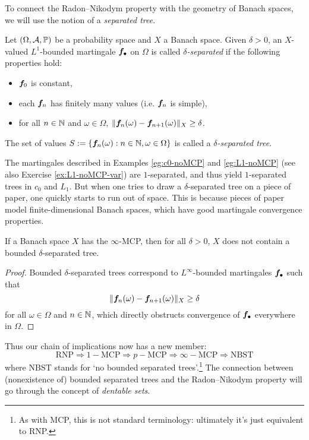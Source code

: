 To connect the Radon--Nikodym property with the geometry of Banach spaces, we will use the notion of a \emph{separated tree}.

\begin{defn}
  Let $(\Omega,\mathcal{A},\mathbb{P})$ be a probability space and $X$ a Banach space.
  Given $\delta > 0$, an $X$-valued $L^1$-bounded martingale $\bm{f}_\bullet$ on $\Omega$ is called \emph{$\delta$-separated} if the following properties hold:
  \begin{itemize}
  \item $\bm{f}_0$ is constant,
  \item each $\bm{f}_n$ has finitely many values (i.e. $\bm{f}_{n}$ is simple),
  \item for all $n \in \mathbb{N}$ and $\omega \in \Omega$, $\|\bm{f}_n(\omega) - \bm{f}_{n+1}(\omega)\|_X \geq \delta$.
  \end{itemize}
  The set of values $S := \{\bm{f}_n(\omega) : n \in \mathbb{N}, \omega \in \Omega\}$ is called a \emph{$\delta$-separated tree}.  
\end{defn}

The martingales described in Examples \ref{eg:c0-noMCP} and \ref{eg:L1-noMCP} (see also Exercise \ref{ex:L1-noMCP-var}) are $1$-separated, and thus yield $1$-separated trees in $c_0$ and $L_1$.
But when one tries to draw a $\delta$-separated tree on a piece of paper, one quickly starts to run out of space.
This is because pieces of paper model finite-dimensional Banach spaces, which have good martingale convergence properties.

\begin{prop}
  If a Banach space $X$ has the $\infty$-MCP, then for all $\delta > 0$, $X$ does not contain a bounded $\delta$-separated tree.
\end{prop}

\begin{proof}
  Bounded $\delta$-separated trees correspond to $L^\infty$-bounded martingales $\bm{f}_{\bullet}$ such that
  \begin{equation*}
    \|\bm{f}_n(\omega) - \bm{f}_{n+1}(\omega)\|_{X} \geq \delta
  \end{equation*}
  for all $\omega \in \Omega$ and $n \in \mathbb{N}$,
  which directly obstructs convergence of $\bm{f}_\bullet$ everywhere in $\Omega$.
\end{proof}

Thus our chain of implications now has a new member:
\begin{equation*}
  \mathrm{RNP} \Longrightarrow 1-\mathrm{MCP} \Longrightarrow p-\mathrm{MCP} \Longrightarrow \infty-\mathrm{MCP}
  \Longrightarrow \mathrm{NBST}
\end{equation*}
where NBST stands for `no bounded separated trees'.\footnote{As with MCP, this is not standard terminology: ultimately it's just equivalent to RNP.}
The connection between (nonexistence of) bounded separated trees and the Radon--Nikodym property will go through the concept of \emph{dentable sets}.

